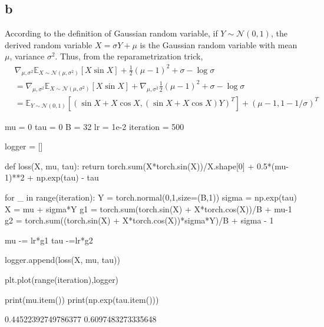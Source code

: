 \documentclass[10pt]{article}
\begin{document}
\subsection*{b}
According to the definition of Gaussian random variable, if $Y\sim \mathcal{N}(0,1)$, the derived random variable $X = \sigma Y + \mu$ is the Gaussian random variable with mean $\mu$, variance $\sigma^2$. Thus, from the reparametrization trick, 
\begin{align*}
    &\nabla_{\mu, \sigma^2} \mathbb{E}_{X\sim \mathcal{N}(\mu, \sigma^2)}\left[X \sin X\right] + \frac{1}{2}(\mu - 1)^2 + \sigma - \log \sigma \\
    &= \nabla_{\mu, \sigma^2} \mathbb{E}_{X\sim \mathcal{N}(\mu, \sigma^2)}\left[X \sin X \right] + \nabla_{\mu, \sigma^2} \frac{1}{2}(\mu - 1)^2 + \sigma - \log \sigma\\  
    &= \mathbb{E}_{Y\sim \mathcal{N}(0,1)}\left[\left(\sin X + X\cos X, (\sin X + X\cos X) Y\right)^T\right] + (\mu-1, 1 - 1/\sigma)^T
\end{align*}
\begin{python}
mu = 0
tau = 0
B = 32
lr = 1e-2
iteration = 500

logger = []

def loss(X, mu, tau):
    return torch.sum(X*torch.sin(X))/X.shape[0] + 0.5*(mu-1)**2 + np.exp(tau) - tau

for _ in range(iteration):
    Y = torch.normal(0,1,size=(B,1))
    sigma = np.exp(tau)
    X = mu + sigma*Y
    g1 = torch.sum(torch.sin(X) + X*torch.cos(X))/B + mu-1
    g2 = torch.sum((torch.sin(X) + X*torch.cos(X))*sigma*Y)/B + sigma - 1

    mu -= lr*g1
    tau -=lr*g2

    logger.append(loss(X, mu, tau))

plt.plot(range(iteration),logger)

print(mu.item())
print(np.exp(tau.item()))
\end{python}
\begin{python}
0.44522392749786377
0.6097483273335648
\end{python}
\end{document}

